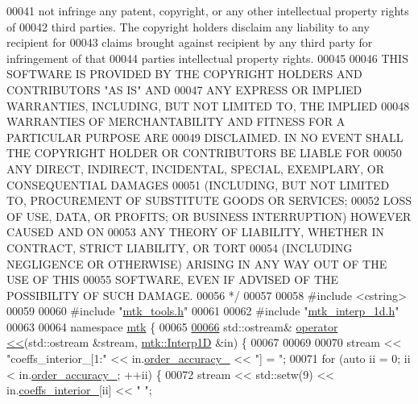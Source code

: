\begin{DoxyCode}
00041 \textcolor{comment}{not infringe any patent, copyright, or any other intellectual property rights of}
00042 \textcolor{comment}{third parties. The copyright holders disclaim any liability to any recipient for}
00043 \textcolor{comment}{claims brought against recipient by any third party for infringement of that}
00044 \textcolor{comment}{parties intellectual property rights.}
00045 \textcolor{comment}{}
00046 \textcolor{comment}{THIS SOFTWARE IS PROVIDED BY THE COPYRIGHT HOLDERS AND CONTRIBUTORS "AS IS" AND}
00047 \textcolor{comment}{ANY EXPRESS OR IMPLIED WARRANTIES, INCLUDING, BUT NOT LIMITED TO, THE IMPLIED}
00048 \textcolor{comment}{WARRANTIES OF MERCHANTABILITY AND FITNESS FOR A PARTICULAR PURPOSE ARE}
00049 \textcolor{comment}{DISCLAIMED. IN NO EVENT SHALL THE COPYRIGHT HOLDER OR CONTRIBUTORS BE LIABLE FOR}
00050 \textcolor{comment}{ANY DIRECT, INDIRECT, INCIDENTAL, SPECIAL, EXEMPLARY, OR CONSEQUENTIAL DAMAGES}
00051 \textcolor{comment}{(INCLUDING, BUT NOT LIMITED TO, PROCUREMENT OF SUBSTITUTE GOODS OR SERVICES;}
00052 \textcolor{comment}{LOSS OF USE, DATA, OR PROFITS; OR BUSINESS INTERRUPTION) HOWEVER CAUSED AND ON}
00053 \textcolor{comment}{ANY THEORY OF LIABILITY, WHETHER IN CONTRACT, STRICT LIABILITY, OR TORT}
00054 \textcolor{comment}{(INCLUDING NEGLIGENCE OR OTHERWISE) ARISING IN ANY WAY OUT OF THE USE OF THIS}
00055 \textcolor{comment}{SOFTWARE, EVEN IF ADVISED OF THE POSSIBILITY OF SUCH DAMAGE.}
00056 \textcolor{comment}{*/}
00057 
00058 \textcolor{preprocessor}{#include <cstring>}
00059 
00060 \textcolor{preprocessor}{#include "\hyperlink{mtk__tools_8h}{mtk\_tools.h}"}
00061 
00062 \textcolor{preprocessor}{#include "\hyperlink{mtk__interp__1d_8h}{mtk\_interp\_1d.h}"}
00063 
00064 \textcolor{keyword}{namespace }\hyperlink{namespacemtk}{mtk} \{
00065 
\hypertarget{mtk__interp__1d_8cc_source_l00066}{}\hyperlink{namespacemtk_a1defe4e644a8c7d89bcceb0b1bc2372f}{00066} std::ostream& \hyperlink{namespacemtk_ad3bcf52cda59ddb5fc7b4bdce76c46dc}{operator <<}(std::ostream &stream, \hyperlink{classmtk_1_1Interp1D}{mtk::Interp1D} &in) \{
00067 
00069 
00070   stream << \textcolor{stringliteral}{"coeffs\_interior\_[1:"} << in.\hyperlink{classmtk_1_1Interp1D_a1ee8467d93536dc04240cd76f0d95c9c}{order\_accuracy\_} << \textcolor{stringliteral}{"] = "};
00071   \textcolor{keywordflow}{for} (\textcolor{keyword}{auto} ii = 0; ii < in.\hyperlink{classmtk_1_1Interp1D_a1ee8467d93536dc04240cd76f0d95c9c}{order\_accuracy\_}; ++ii) \{
00072     stream << std::setw(9) << in.\hyperlink{classmtk_1_1Interp1D_abae01ab84103d8b11903357cfdeb94d5}{coeffs\_interior\_}[ii] << \textcolor{stringliteral}{" "};

\end{DoxyCode}
